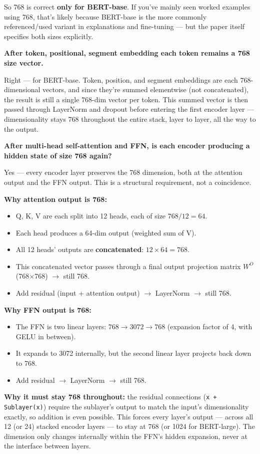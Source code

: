 So 768 is correct \textbf{only for BERT-base}. If you've mainly seen worked examples using 768, that's likely because BERT-base is the more commonly referenced/used variant in explanations and fine-tuning --- but the paper itself specifies both sizes explicitly.

\textbf{After token, positional, segment embedding each token remains a 768 size vector.}

Right --- for BERT-base. Token, position, and segment embeddings are each 768-dimensional vectors, and since they're summed elementwise (not concatenated), the result is still a single 768-dim vector per token. This summed vector is then passed through LayerNorm and dropout before entering the first encoder layer --- dimensionality stays 768 throughout the entire stack, layer to layer, all the way to the output.

\textbf{After multi-head self-attention and FFN, is each encoder producing a hidden state of size 768 again?}

Yes --- every encoder layer preserves the 768 dimension, both at the attention output and the FFN output. This is a structural requirement, not a coincidence.

\textbf{Why attention output is 768:}
\begin{itemize}
\item Q, K, V are each split into 12 heads, each of size $768/12 = 64$.
\item Each head produces a 64-dim output (weighted sum of V).
\item All 12 heads' outputs are \textbf{concatenated}: $12 \times 64 = 768$.
\item This concatenated vector passes through a final output projection matrix $W^O$ (768$\times$768) $\to$ still 768.
\item Add residual (input + attention output) $\to$ LayerNorm $\to$ still 768.
\end{itemize}

\textbf{Why FFN output is 768:}
\begin{itemize}
\item The FFN is two linear layers: $768 \to 3072 \to 768$ (expansion factor of 4, with GELU in between).
\item It expands to 3072 internally, but the second linear layer projects back down to 768.
\item Add residual $\to$ LayerNorm $\to$ still 768.
\end{itemize}

\textbf{Why it must stay 768 throughout:} the residual connections (\texttt{x + Sublayer(x)}) require the sublayer's output to match the input's dimensionality exactly, so addition is even possible. This forces every layer's output --- across all 12 (or 24) stacked encoder layers --- to stay at 768 (or 1024 for BERT-large). The dimension only changes internally within the FFN's hidden expansion, never at the interface between layers.

